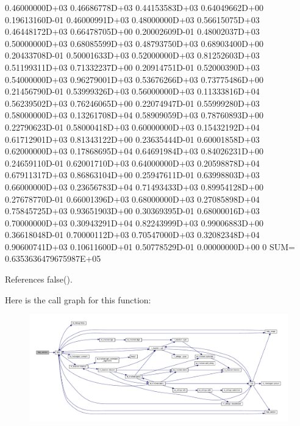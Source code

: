 \begin{DoxyVerb}
    0.46000000D+03    0.46686778D+03    0.44153583D+03    0.64049662D+00    0.19613160D-01    0.46000991D+03
    0.48000000D+03    0.56615075D+03    0.46448172D+03    0.66478705D+00    0.20002609D-01    0.48002037D+03
    0.50000000D+03    0.68085599D+03    0.48793750D+03    0.68903400D+00    0.20433708D-01    0.50001633D+03
    0.52000000D+03    0.81252603D+03    0.51199311D+03    0.71332237D+00    0.20914751D-01    0.52000390D+03
    0.54000000D+03    0.96279001D+03    0.53676266D+03    0.73775486D+00    0.21456790D-01    0.53999326D+03
    0.56000000D+03    0.11333816D+04    0.56239502D+03    0.76246065D+00    0.22074947D-01    0.55999280D+03
    0.58000000D+03    0.13261708D+04    0.58909059D+03    0.78760893D+00    0.22790623D-01    0.58000418D+03
    0.60000000D+03    0.15432192D+04    0.61712901D+03    0.81343122D+00    0.23635444D-01    0.60001858D+03
    0.62000000D+03    0.17868695D+04    0.64691984D+03    0.84026231D+00    0.24659110D-01    0.62001710D+03
    0.64000000D+03    0.20598878D+04    0.67911317D+03    0.86863104D+00    0.25947611D-01    0.63998803D+03
    0.66000000D+03    0.23656783D+04    0.71493433D+03    0.89954128D+00    0.27678770D-01    0.66001396D+03
    0.68000000D+03    0.27085898D+04    0.75845725D+03    0.93651903D+00    0.30369395D-01    0.68000016D+03
    0.70000000D+03    0.30943291D+04    0.82243999D+03    0.99006883D+00    0.36618048D-01    0.70000112D+03
    0.70547000D+03    0.32082348D+04    0.90600741D+03    0.10611600D+01    0.50778529D-01    0.00000000D+00
0         SUM=  0.6353636479675987E+05 \end{DoxyVerb}
 

References false().

Here is the call graph for this function\+:
\nopagebreak
\begin{figure}[H]
\begin{center}
\leavevmode
\includegraphics[width=350pt]{numdiff_8f90_a39c21619b08a3c22f19e2306efd7f766_cgraph}
\end{center}
\end{figure}
\mbox{\label{numdiff_8f90_a5d78de65cd7fa1c21f36db3018f1ffaf}} 
